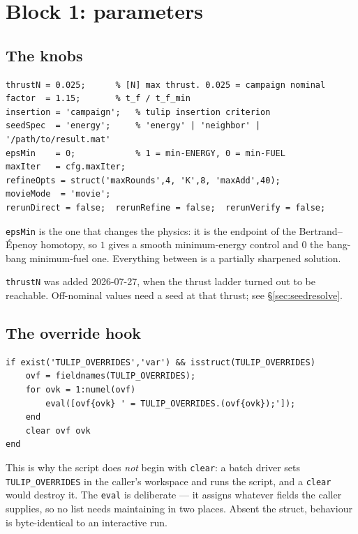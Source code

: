 \documentclass[11pt]{article}
\begin{document}
\section{Block 1: parameters}

\subsection{The knobs}

\begin{lstlisting}
thrustN = 0.025;      % [N] max thrust. 0.025 = campaign nominal
factor  = 1.15;       % t_f / t_f_min
insertion = 'campaign';   % tulip insertion criterion
seedSpec  = 'energy';     % 'energy' | 'neighbor' | '/path/to/result.mat'
epsMin    = 0;            % 1 = min-ENERGY, 0 = min-FUEL
maxIter   = cfg.maxIter;
refineOpts = struct('maxRounds',4, 'K',8, 'maxAdd',40);
movieMode  = 'movie';
rerunDirect = false;  rerunRefine = false;  rerunVerify = false;
\end{lstlisting}

\texttt{epsMin} is the one that changes the physics: it is the endpoint of the
Bertrand--\'Epenoy homotopy, so $1$ gives a smooth minimum-energy control and
$0$ the bang-bang minimum-fuel one. Everything between is a partially sharpened
solution.

\texttt{thrustN} was added 2026-07-27, when the thrust ladder turned out to be
reachable. Off-nominal values need a seed at that thrust; see
\S\ref{sec:seedresolve}.

\subsection{The override hook}

\begin{lstlisting}
if exist('TULIP_OVERRIDES','var') && isstruct(TULIP_OVERRIDES)
    ovf = fieldnames(TULIP_OVERRIDES);
    for ovk = 1:numel(ovf)
        eval([ovf{ovk} ' = TULIP_OVERRIDES.(ovf{ovk});']);
    end
    clear ovf ovk
end
\end{lstlisting}

This is why the script does \emph{not} begin with \texttt{clear}: a batch driver
sets \texttt{TULIP\_OVERRIDES} in the caller's workspace and runs the script,
and a \texttt{clear} would destroy it. The \texttt{eval} is deliberate --- it
assigns whatever fields the caller supplies, so no list needs maintaining in two
places. Absent the struct, behaviour is byte-identical to an interactive run.
\end{document}

